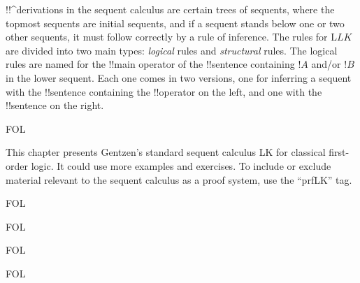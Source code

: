 \documentclass[10pt,a4paper]{article}
\theoremstyle{plain}
\theoremstyle{definition}
\theoremstyle{remark}
\newenvironment{editorial}{}{}
\newcommand*{\olchapter}[3]{}
\newcommand*{\olimport}[1]{}
\providecommand{\Log}{\ensuremath{\mathrm{L}}}
\providecommand{\iftag}[1]{#1}
\providecommand{\iftag}{}
\begin{document}
!!^{derivation}s in the sequent calculus are certain trees of
sequents, where the topmost sequents are initial sequents, and if a
sequent stands below one or two other sequents, it must follow
correctly by a rule of inference.  The rules for $\Log{LK}$ are
divided into two main types: \emph{logical} rules and
\emph{structural} rules.  The logical rules are named for the !!{main
  operator} of the !!{sentence} containing $!A$ and/or $!B$ in the
lower sequent. Each one comes in two versions, one for inferring a
sequent with the !!{sentence} containing the !!{operator} on the left,
and one with the !!{sentence} on the right.





\iftag{FOL}
      {\olchapter{fol}{seq}{The Sequent Calculus}}
      {\olchapter{pl}{seq}{The Sequent Calculus}}

\begin{editorial}
  This chapter presents Gentzen's standard sequent calculus LK for
  classical first-order logic.  It could use more examples and
  exercises. To include or exclude material relevant to the sequent
  calculus as a proof system, use the ``prfLK'' tag.
\end{editorial}

\olimport{rules-and-proofs}

\olimport{propositional-rules}

\iftag{FOL}{%
  \olimport{quantifier-rules}
}{}

\olimport{structural-rules}

\olimport{derivations}

\olimport{proving-things}

\iftag{FOL}{%
  \olimport{proving-things-quant}
}{}

\olimport{proof-theoretic-notions}

\olimport{provability-consistency}

\olimport{provability-propositional}

\iftag{FOL}{%
  \olimport{provability-quantifiers}
}{}

\olimport{soundness}

\iftag{FOL}{%
  \olimport{identity}
  \olimport{soundness-identity}
}{}

\OLEndChapterHook


\end{document}
